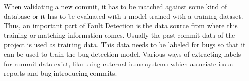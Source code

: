 When validating a new commit, it has to be matched against some kind of database or it has to be evaluated with a model trained with a training dataset. Thus, an important part of Fault Detection is the data source from where this training or matching information comes. Usually the past commit data of the project is used as training data.
This data needs to be labeled for bugs so that it can be used to train the bug detection model.
Various ways
of extracting labels for commit data exist, like using external issue systems which associate issue reports and bug-introducing commits.



